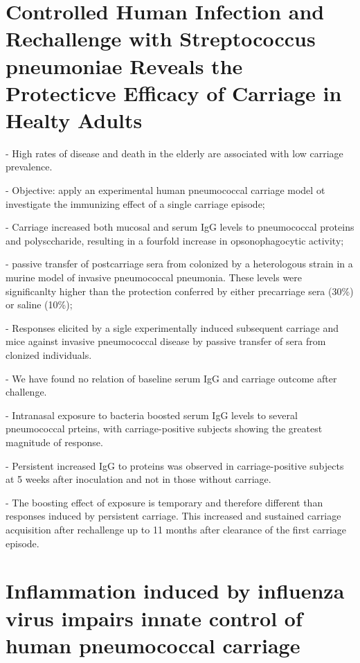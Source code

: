 \documentclass[
]{book}
\begin{document}
\hypertarget{controlled-human-infection-and-rechallenge-with-streptococcus-pneumoniae-reveals-the-protecticve-efficacy-of-carriage-in-healty-adults}{%
\section{Controlled Human Infection and Rechallenge with Streptococcus pneumoniae Reveals the Protecticve Efficacy of Carriage in Healty Adults}\label{controlled-human-infection-and-rechallenge-with-streptococcus-pneumoniae-reveals-the-protecticve-efficacy-of-carriage-in-healty-adults}}

- High rates of disease and death in the elderly are associated with low carriage prevalence.

- Objective: apply an experimental human pneumococcal carriage model ot investigate the immunizing effect of a single carriage episode;

- Carriage increased both mucosal and serum IgG levels to pneumococcal proteins and polysccharide, resulting in a fourfold increase in opsonophagocytic activity;

- passive transfer of postcarriage sera from colonized by a heterologous strain in a murine model of invasive pneumococcal pneumonia. These levels were significanlty higher than the protection conferred by either precarriage sera (30\%) or saline (10\%);

- Responses elicited by a sigle experimentally induced subsequent carriage and mice against invasive pneumococcal disease by passive transfer of sera from clonized individuals.

- We have found no relation of baseline serum IgG and carriage outcome after challenge.

- Intranasal exposure to bacteria boosted serum IgG levels to several pneumococcal prteins, with carriage-positive subjects showing the greatest magnitude of response.

- Persistent increased IgG to proteins was observed in carriage-positive subjects at 5 weeks after inoculation and not in those without carriage.

- The boosting effect of exposure is temporary and therefore different than responses induced by persistent carriage. This increased and sustained carriage acquisition after rechallenge up to 11 months after clearance of the first carriage episode.

\hypertarget{inflammation-induced-by-influenza-virus-impairs-innate-control-of-human-pneumococcal-carriage}{%
\section{Inflammation induced by influenza virus impairs innate control of human pneumococcal carriage}\label{inflammation-induced-by-influenza-virus-impairs-innate-control-of-human-pneumococcal-carriage}}
\end{document}
